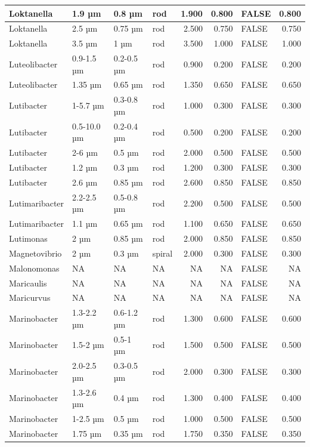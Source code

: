 \documentclass[
]{article}
\begin{document}
\begin{table}
\begin{tabular}{l|l|l|l|r|r|l|r}
\hline
Loktanella & 1.9 µm & 0.8 µm & rod & 1.900 & 0.800 & FALSE & 0.800\\
\hline
Loktanella & 2.5 µm & 0.75 µm & rod & 2.500 & 0.750 & FALSE & 0.750\\
\hline
Loktanella & 3.5 µm & 1 µm & rod & 3.500 & 1.000 & FALSE & 1.000\\
\hline
Luteolibacter & 0.9-1.5 µm & 0.2-0.5 µm & rod & 0.900 & 0.200 & FALSE & 0.200\\
\hline
Luteolibacter & 1.35 µm & 0.65 µm & rod & 1.350 & 0.650 & FALSE & 0.650\\
\hline
Lutibacter & 1-5.7 µm & 0.3-0.8 µm & rod & 1.000 & 0.300 & FALSE & 0.300\\
\hline
Lutibacter & 0.5-10.0 µm & 0.2-0.4 µm & rod & 0.500 & 0.200 & FALSE & 0.200\\
\hline
Lutibacter & 2-6 µm & 0.5 µm & rod & 2.000 & 0.500 & FALSE & 0.500\\
\hline
Lutibacter & 1.2 µm & 0.3 µm & rod & 1.200 & 0.300 & FALSE & 0.300\\
\hline
Lutibacter & 2.6 µm & 0.85 µm & rod & 2.600 & 0.850 & FALSE & 0.850\\
\hline
Lutimaribacter & 2.2-2.5 µm & 0.5-0.8 µm & rod & 2.200 & 0.500 & FALSE & 0.500\\
\hline
Lutimaribacter & 1.1 µm & 0.65 µm & rod & 1.100 & 0.650 & FALSE & 0.650\\
\hline
Lutimonas & 2 µm & 0.85 µm & rod & 2.000 & 0.850 & FALSE & 0.850\\
\hline
Magnetovibrio & 2 µm & 0.3 µm & spiral & 2.000 & 0.300 & FALSE & 0.300\\
\hline
Malonomonas & NA & NA & NA & NA & NA & FALSE & NA\\
\hline
Maricaulis & NA & NA & NA & NA & NA & FALSE & NA\\
\hline
Maricurvus & NA & NA & NA & NA & NA & FALSE & NA\\
\hline
Marinobacter & 1.3-2.2 µm & 0.6-1.2 µm & rod & 1.300 & 0.600 & FALSE & 0.600\\
\hline
Marinobacter & 1.5-2 µm & 0.5-1 µm & rod & 1.500 & 0.500 & FALSE & 0.500\\
\hline
Marinobacter & 2.0-2.5 µm & 0.3-0.5 µm & rod & 2.000 & 0.300 & FALSE & 0.300\\
\hline
Marinobacter & 1.3-2.6 µm & 0.4 µm & rod & 1.300 & 0.400 & FALSE & 0.400\\
\hline
Marinobacter & 1-2.5 µm & 0.5 µm & rod & 1.000 & 0.500 & FALSE & 0.500\\
\hline
Marinobacter & 1.75 µm & 0.35 µm & rod & 1.750 & 0.350 & FALSE & 0.350\\

\end{tabular}
\end{table}
\end{document}
